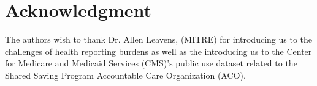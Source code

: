 \documentclass[conference]{IEEEtran}
\begin{document}
\section{Acknowledgment}
The authors wish to thank Dr. Allen Leavens, (MITRE) for introducing us to the challenges of health reporting burdens as well as the introducing us to the Center for Medicare and Medicaid Services (CMS)'s public use dataset related to the Shared Saving Program Accountable Care Organization (ACO).  

\clearpage







\newpage
\listoftodos[Notes]
\end{document}
